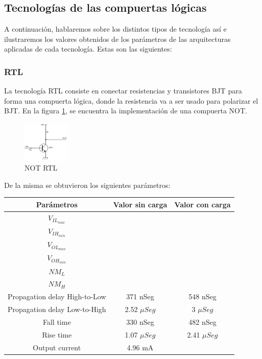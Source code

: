 \subsection{Tecnologías de las compuertas lógicas}
A continuación, hablaremos sobre los distintos tipos de tecnología así e ilustraremos los valores obtenidos de los parámetros de las arquitecturas aplicadas de cada tecnología. Estas son las siguientes:

\subsubsection{RTL}
La tecnología RTL consiste en conectar resistencias y transistores BJT para forma una compuerta lógica, donde la resistencia va a ser usado para polarizar el BJT. En la figura \ref{fig:eje1_1}, se encuentra la implementación de una compuerta NOT.
\begin{figure}[H]
	\centering
	\includegraphics[width=0.2\textwidth]{Ejercicio1/RTL.png}
	\caption{NOT RTL}
	\label{fig:eje1_1}
\end{figure}
De la misma se obtuvieron los siguientes parámetros:
\begin{table}[H]
	\centering
	\begin{tabular}{|c|c|c|}
		\hline
		Parámetros & Valor sin carga & Valor con carga\\
		\hline
		$V_{IL_{max}}$ & & \\
		\hline
		$V_{IH_{min}}$ & & \\
		\hline
		$V_{OL_{max}}$ & & \\
		\hline
		$V_{OH_{min}}$ & & \\
		\hline
		$NM_{L}$ & & \\
		\hline
		$NM_{H}$ & & \\
		\hline
		Propagation delay High-to-Low & 371 nSeg &  548 nSeg\\
		\hline
		Propagation delay Low-to-High & 2.52 $\mu Seg$ &  3 $\mu Seg$\\
		\hline
		Fall time & 330 nSeg & 482 nSeg \\
		\hline
		Rise time & 1.07 $\mu Seg$ & 2.41 $\mu Seg$\\
		\hline
		Output current & 4.96 mA & \\
		\hline
	\end{tabular}
\end{table}

